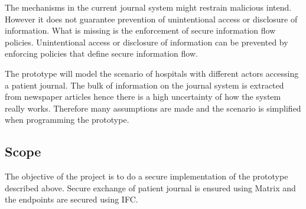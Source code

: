 The mechanisms in the current journal system might restrain malicious intend. However it does not guarantee prevention of unintentional access or disclosure of information. What is missing is the enforcement of secure information flow policies. Unintentional access or disclosure of information can be prevented by enforcing policies that define secure information flow.

The prototype will model the scenario of hospitals with different actors accessing a patient journal. The bulk of information on the journal system is extracted from newspaper articles hence there is a high uncertainty of how the system really works. Therefore many assumptions are made and the scenario is simplified when programming the prototype.






\subsection{Scope} 


The objective of the project is to do a secure implementation of the prototype described above. Secure exchange of patient journal is ensured using Matrix and the endpoints are secured using IFC.

